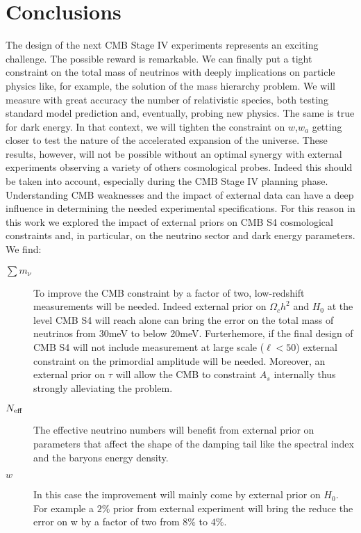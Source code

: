 \documentclass[aps,prd,reprint,superscriptaddress]{revtex4-1}
\begin{document}
\section{Conclusions  \label{sec:conclusions}}
The design of the next CMB Stage IV experiments represents an exciting challenge. The possible reward is remarkable. We can finally put a tight constraint on the total mass of neutrinos with deeply implications on particle physics like, for example, the solution of the mass hierarchy problem. We will measure with great accuracy the number of relativistic species, both testing standard model prediction and, eventually, probing new physics. The same is true for dark energy. In that context, we will tighten the constraint on $w$,$w_{a}$ getting closer to test the nature of the accelerated expansion of the universe. These results, however, will not be possible without an optimal synergy with external experiments observing a variety of others cosmological probes.
Indeed this should be taken into account, especially during the CMB Stage IV planning phase. Understanding CMB weaknesses and the impact of external data can have a deep influence in determining the needed experimental specifications.
For this reason in this work we explored the impact of external priors on CMB S4 cosmological constraints and, in particular, on the neutrino sector and dark energy parameters.
We find:
\begin{description}
\item[$\sum m_\nu$] To improve the CMB constraint by a factor of two, low-redshift measurements will be needed. Indeed external prior on $\Omega_{c}h^{2}$ and $H_{0}$ at the level CMB S4 will reach alone can bring the error on the total mass of neutrinos from $30$meV to below 20meV.
Furterhemore, if the final design of CMB S4 will not include measurement at large scale ($\ell<50$) external constraint on the primordial amplitude will be needed. Moreover, an external prior on $\tau$ will allow the CMB to constraint $A_{s}$ internally thus strongly alleviating the problem.
\item[$N_{\rm eff}$] The effective neutrino numbers will benefit from external prior on parameters that affect the shape of the damping tail like the spectral index and the baryons energy density.
\item[$w$] In this case the improvement will mainly come by external prior on $H_{0}$. For example a $2\%$ prior from external experiment will bring the reduce the error on w by a factor of two from 8$\%$ to $4\%$. 
\end{description}
\end{document}
